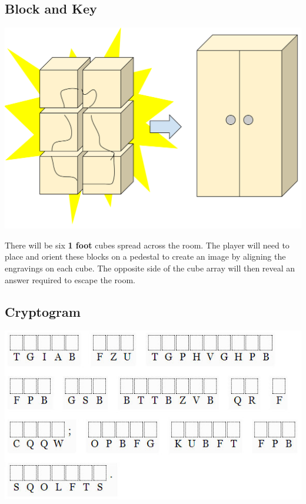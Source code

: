 \documentclass[12pt]{article}
\begin{document}
\subsection{Block and Key}
\label{sec:org3423979}

\begin{center}
\includegraphics[width=.9\linewidth]{./img/blockandkey.png}
\end{center}

There will be six \textbf{1 foot} cubes spread across the room. The player will need to place and orient these blocks on a pedestal to create an image by aligning the engravings on each cube. The opposite side of the cube array will then reveal an answer required to escape the room.

\subsection{Cryptogram}
\label{sec:orgc9fa035}

\begin{center}
\includegraphics[width=.9\linewidth]{./img/cryptogram.png}
\end{center}
\end{document}
